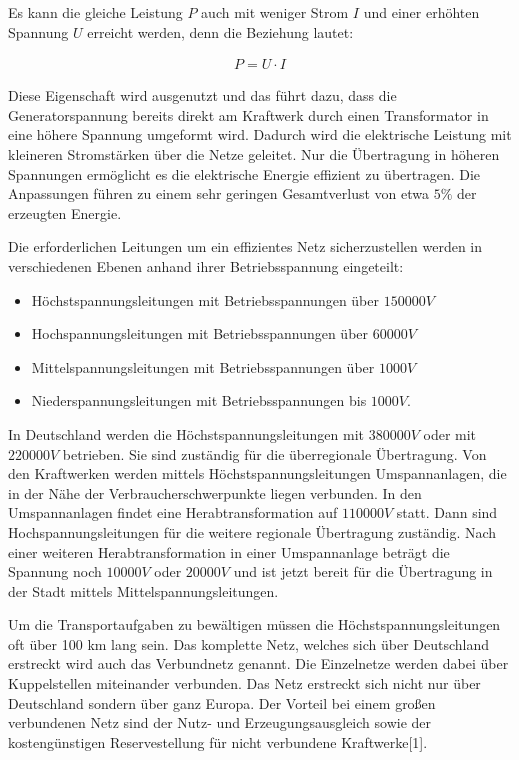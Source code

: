Es kann die gleiche Leistung $P$ auch mit weniger Strom $I$ und einer erhöhten Spannung $U$ erreicht werden, denn die Beziehung lautet:

\begin{align}
	P = U \cdot I
\end{align}  

Diese Eigenschaft wird ausgenutzt und das führt dazu, dass die Generatorspannung bereits direkt am Kraftwerk durch einen Transformator in eine höhere Spannung umgeformt wird. Dadurch wird die elektrische Leistung mit kleineren Stromstärken über die Netze geleitet. Nur die Übertragung in höheren Spannungen ermöglicht es die elektrische Energie effizient zu übertragen. Die Anpassungen führen zu einem sehr geringen Gesamtverlust von etwa $5\%$ der erzeugten Energie. 

Die erforderlichen Leitungen um ein effizientes Netz sicherzustellen werden in verschiedenen Ebenen anhand ihrer Betriebsspannung eingeteilt:
\begin{itemize}
	\item Höchstspannungsleitungen mit Betriebsspannungen über $150000V$
	\item Hochspannungsleitungen mit Betriebsspannungen über $60000V$
	\item Mittelspannungsleitungen mit Betriebsspannungen über $1000V$
	\item Niederspannungsleitungen mit Betriebsspannungen bis $1000V$.
\end{itemize} 

In Deutschland werden die Höchstspannungsleitungen mit $380 000V$ oder mit $220 000V$ betrieben. Sie sind zuständig für die überregionale Übertragung. Von den Kraftwerken werden mittels Höchstspannungsleitungen Umspannanlagen, die in der Nähe der Verbraucherschwerpunkte liegen verbunden. In den Umspannanlagen findet eine Herabtransformation auf $110 000V$ statt. Dann sind Hochspannungsleitungen für die weitere regionale Übertragung zuständig. Nach einer weiteren Herabtransformation in einer Umspannanlage beträgt die Spannung noch $10 000V$ oder $20 000V$ und ist jetzt bereit für die Übertragung in der Stadt mittels Mittelspannungsleitungen.

Um die Transportaufgaben zu bewältigen müssen die Höchstspannungsleitungen oft über 100 km lang sein. Das komplette Netz, welches sich über Deutschland erstreckt wird auch das Verbundnetz genannt. Die Einzelnetze werden dabei über Kuppelstellen miteinander verbunden. Das Netz erstreckt sich nicht nur über Deutschland sondern über ganz Europa. Der Vorteil bei einem großen verbundenen Netz sind der Nutz- und Erzeugungsausgleich sowie der kostengünstigen Reservestellung für nicht verbundene Kraftwerke[1].

